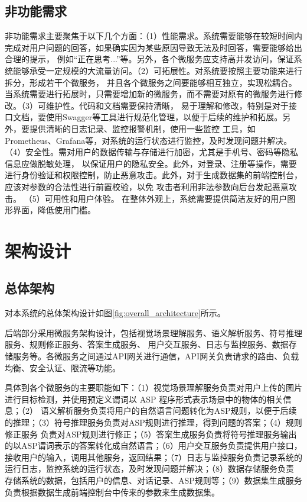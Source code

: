 \subsection{非功能需求}
非功能需求主要聚焦于以下几个方面：（1）性能需求。系统需要能够在较短时间内完成对用户问题的回答，如果确实因为某些原因导致无法及时回答，需要能够给出合理的提示，
例如“正在思考...”等。另外，各个微服务应支持高并发访问，保证系统能够承受一定规模的大流量访问。（2）可拓展性。对系统要按照主要功能来进行拆分，形成若干个微服务，
并且各个微服务之间要能够相互独立，实现松耦合。当系统需要进行拓展时，只需要增加新的微服务，而不需要对原有的微服务进行修改。（3）可维护性。代码和文档需要保持清晰，
易于理解和修改，特别是对于接口文档，要使用Swagger等工具进行规范化管理，以便于后续的维护和拓展。另外，要提供清晰的日志记录、监控报警机制，使用一些监控
工具，如Prometheus、Grafana等，对系统的运行状态进行监控，及时发现问题并解决。
（4）安全性。需对用户的数据传输与存储进行加密，尤其是手机号、密码等隐私信息应做脱敏处理，
以保证用户的隐私安全。此外，对登录、注册等操作，需要进行身份验证和权限控制，防止恶意攻击。此外，对于生成数据集的前端控制台，应该对参数的合法性进行前置校验，以免
攻击者利用非法参数向后台发起恶意攻击。
（5）可用性和用户体验。
在整体外观上，系统需要提供简洁友好的用户图形界面，降低使用门槛。

\section{架构设计}
\subsection{总体架构}
对本系统的总体架构设计如图\ref{fig:overall_architecture}所示。

后端部分采用微服务架构设计，包括视觉场景理解服务、语义解析服务、符号推理服务、规则修正服务、答案生成服务、
用户交互服务、日志与监控服务、数据存储服务等。各微服务之间通过API网关进行通信，API网关负责请求的路由、负载均衡、安全认证、限流等功能。

具体到各个微服务的主要职能如下：（1）视觉场景理解服务负责对用户上传的图片进行目标检测，并使用预定义谓词以 ASP 程序形式表示场景中的物体的相关信息；（2）
语义解析服务负责将用户的自然语言问题转化为ASP规则，以便于后续的推理；（3）符号推理服务负责对ASP规则进行推理，得到问题的答案；（4）规则修正服务
负责对ASP规则进行修正；（5）答案生成服务负责将符号推理服务输出的以ASP谓词表示的答案转化成自然语言；（6）用户交互服务负责提供用户接口，
接收用户的输入，调用其他服务，返回结果；（7）日志与监控服务负责记录系统的运行日志，监控系统的运行状态，及时发现问题并解决；（8）数据存储服务负责
存储系统的数据，包括用户的信息、对话记录、ASP规则等；（9）数据集生成服务负责根据数据生成前端控制台中传来的参数来生成数据集。

